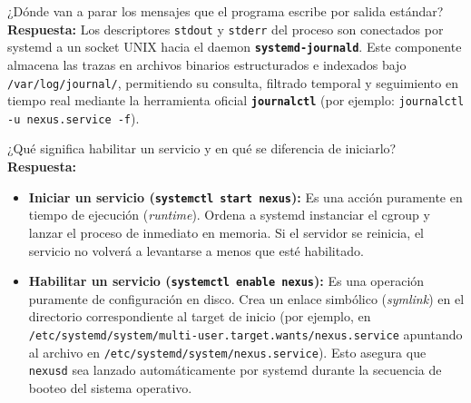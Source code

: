 \documentclass[10pt,a4paper]{article}
\begin{document}
\begin{pregunta}{¿Dónde van a parar los mensajes que el programa escribe por salida estándar?}
    \textbf{Respuesta:} Los descriptores \texttt{stdout} y \texttt{stderr} del proceso son conectados por systemd a un socket UNIX hacia el daemon \textbf{\texttt{systemd-journald}}. Este componente almacena las trazas en archivos binarios estructurados e indexados bajo \texttt{/var/log/journal/}, permitiendo su consulta, filtrado temporal y seguimiento en tiempo real mediante la herramienta oficial \textbf{\texttt{journalctl}} (por ejemplo: \texttt{journalctl -u nexus.service -f}).
\end{pregunta}

\begin{pregunta}{¿Qué significa habilitar un servicio y en qué se diferencia de iniciarlo?}
    \textbf{Respuesta:}
    \begin{itemize}[leftmargin=*]
        \item \textbf{Iniciar un servicio (\texttt{systemctl start nexus}):} Es una acción puramente en tiempo de ejecución (\textit{runtime}). Ordena a systemd instanciar el cgroup y lanzar el proceso de inmediato en memoria. Si el servidor se reinicia, el servicio no volverá a levantarse a menos que esté habilitado.
        \item \textbf{Habilitar un servicio (\texttt{systemctl enable nexus}):} Es una operación puramente de configuración en disco. Crea un enlace simbólico (\textit{symlink}) en el directorio correspondiente al target de inicio (por ejemplo, en \texttt{/etc/systemd/system/multi-user.target.wants/nexus.service} apuntando al archivo en \texttt{/etc/systemd/system/nexus.service}). Esto asegura que \texttt{nexusd} sea lanzado automáticamente por systemd durante la secuencia de booteo del sistema operativo.
    \end{itemize}
\end{pregunta}
\end{document}
